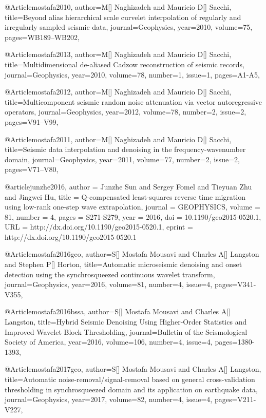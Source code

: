 @Article{mostafa2010,
  author={M[] Naghizadeh and Mauricio D[] Sacchi},
  title={Beyond alias hierarchical scale curvelet interpolation of regularly and irregularly sampled seismic data},
  journal={Geophysics},
  year=2010,
  volume=75,
  pages={WB189–WB202},
}

@Article{mostafa2013,
  author={M[] Naghizadeh and Mauricio D[] Sacchi},
  title={Multidimensional de-aliased Cadzow reconstruction of seismic records},
  journal={Geophysics},
  year=2010,
  volume=78,
  number=1,
  issue=1,
  pages={A1-A5},
}



@Article{mostafa2012,
  author={M[] Naghizadeh and Mauricio D[] Sacchi},
  title={Multicomponent seismic random noise attenuation via vector autoregressive operators},
  journal={Geophysics},
  year=2012,
  volume=78,
  number=2,
  issue=2,
  pages={V91–V99},
}

@Article{mostafa2011,
  author={M[] Naghizadeh and Mauricio D[] Sacchi},
  title={Seismic data interpolation and denoising in the frequency-wavenumber domain},
  journal={Geophysics},
  year=2011,
  volume=77,
  number=2,
  issue=2,
  pages={V71–V80},
}




@article{junzhe2016,
author = {Junzhe Sun and Sergey Fomel and Tieyuan Zhu and Jingwei Hu},
title = {Q-compensated least-squares reverse time migration using low-rank one-step wave extrapolation},
journal = {GEOPHYSICS},
volume = {81},
number = {4},
pages = {S271-S279},
year = {2016},
doi = {10.1190/geo2015-0520.1},
URL = {http://dx.doi.org/10.1190/geo2015-0520.1},
eprint = {http://dx.doi.org/10.1190/geo2015-0520.1}
}

@Article{mostafa2016geo,
  author={S[] Mostafa Mousavi and Charles A[] Langston and Stephen P[] Horton},
  title={Automatic microseismic denoising and onset detection using the synchrosqueezed continuous wavelet transform},
  journal={Geophysics},
  year=2016,
  volume=81,
  number=4,
  issue=4,
  pages={V341-V355},
}

@Article{mostafa2016bssa,
  author={S[] Mostafa Mousavi and Charles A[] Langston},
  title={Hybrid Seismic Denoising Using Higher-Order Statistics and Improved Wavelet Block Thresholding},
  journal={Bulletin of the Seismological Society of America},
  year=2016,
  volume=106,
  number=4,
  issue=4,
  pages={1380-1393},
}

@Article{mostafa2017geo,
  author={S[] Mostafa Mousavi and Charles A[] Langston},
  title={Automatic noise-removal/signal-removal based on general cross-validation thresholding in synchrosqueezed domain and its application on earthquake data},
  journal={Geophysics},
  year=2017,
  volume=82,
  number=4,
  issue=4,
  pages={V211-V227},
}

